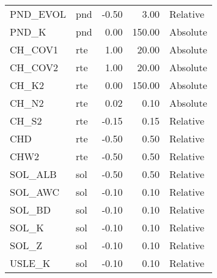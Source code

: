 \begin{table}[ht]
\begin{tabular}{llrrl}
  PND\_EVOL & pnd & -0.50 & 3.00 & Relative \\ 
  PND\_K & pnd & 0.00 & 150.00 & Absolute \\ 
  CH\_COV1 & rte & 1.00 & 20.00 & Absolute \\ 
  CH\_COV2 & rte & 1.00 & 20.00 & Absolute \\ 
  CH\_K2 & rte & 0.00 & 150.00 & Absolute \\ 
  CH\_N2 & rte & 0.02 & 0.10 & Absolute \\ 
  CH\_S2 & rte & -0.15 & 0.15 & Relative \\ 
  CHD & rte & -0.50 & 0.50 & Relative \\ 
  CHW2 & rte & -0.50 & 0.50 & Relative \\ 
  SOL\_ALB & sol & -0.50 & 0.50 & Relative \\ 
  SOL\_AWC & sol & -0.10 & 0.10 & Relative \\ 
  SOL\_BD & sol & -0.10 & 0.10 & Relative \\ 
  SOL\_K & sol & -0.10 & 0.10 & Relative \\ 
  SOL\_Z & sol & -0.10 & 0.10 & Relative \\ 
  USLE\_K & sol & -0.10 & 0.10 & Relative \\ 
   \hline
\end{tabular}
\end{table}
